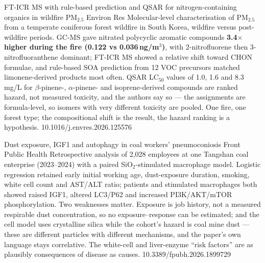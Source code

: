 \documentclass[10pt]{article}
\begin{document}
{FT-ICR MS with rule-based prediction and QSAR for nitrogen-containing organics in
wildfire PM$_{2.5}$}
{Environ Res}
{Molecular-level characterisation of PM$_{2.5}$ from a temperate coniferous forest wildfire
in South Korea, wildfire versus post-wildfire periods. GC-MS gave nitrated polycyclic
aromatic compounds \textbf{3.4$\times$ higher during the fire (0.122 vs 0.036\,ng/m$^3$)},
with 2-nitrofluorene then 3-nitrofluoranthene dominant; FT-ICR MS showed a relative shift
toward CHON formulae, and rule-based SOA prediction from 12 VOC precursors matched
limonene-derived products most often. QSAR LC$_{50}$ values of 1.0, 1.6 and 8.3\,mg/L for
$\beta$-pinene-, $\alpha$-pinene- and isoprene-derived compounds are ranked hazard, not
measured toxicity, and the authors say so --- the assignments are formula-level, so isomers
with very different toxicity are pooled. One fire, one forest type; the compositional shift
is the result, the hazard ranking is a hypothesis.}
{10.1016/j.envres.2026.125576}


{Dust exposure, IGF1 and autophagy in coal workers' pneumoconiosis}
{Front Public Health}
{Retrospective analysis of 2{,}028 employees at one Tangshan coal enterprise (2023--2024)
with a paired SiO$_2$-stimulated macrophage model. Logistic regression retained early
initial working age, dust-exposure duration, smoking, white cell count and AST/ALT ratio;
patients and stimulated macrophages both showed raised IGF1, altered LC3/P62 and increased
PI3K/AKT/mTOR phosphorylation. Two weaknesses matter. Exposure is job history, not a
measured respirable dust concentration, so no exposure--response can be estimated; and the
cell model uses crystalline silica while the cohort's hazard is coal mine dust --- these are
different particles with different mechanisms, and the paper's own language stays
correlative. The white-cell and liver-enzyme ``risk factors'' are as plausibly consequences
of disease as causes.}
{10.3389/fpubh.2026.1899729}

\end{document}
